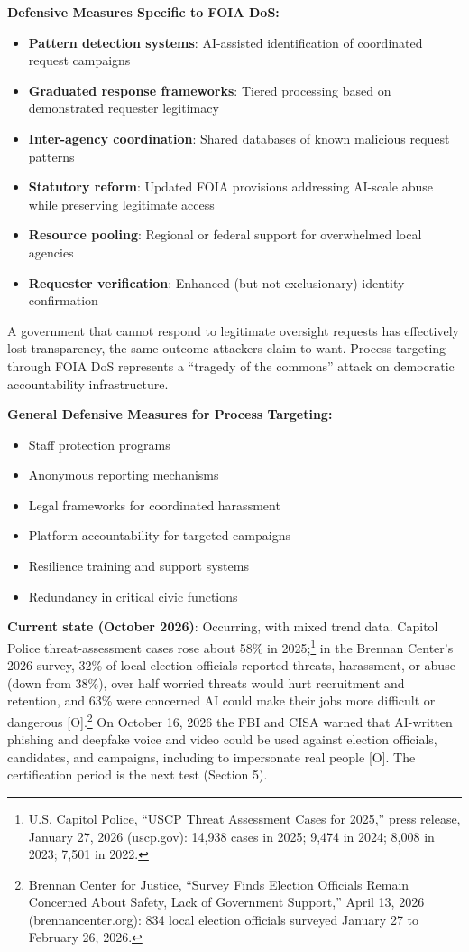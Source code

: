 \documentclass[11pt,letterpaper]{article}
\begin{document}
\textbf{Defensive Measures Specific to FOIA DoS:}
\begin{itemize}
  \item \textbf{Pattern detection systems}: AI-assisted identification of coordinated request campaigns
  \item \textbf{Graduated response frameworks}: Tiered processing based on demonstrated requester legitimacy
  \item \textbf{Inter-agency coordination}: Shared databases of known malicious request patterns
  \item \textbf{Statutory reform}: Updated FOIA provisions addressing AI-scale abuse while preserving legitimate access
  \item \textbf{Resource pooling}: Regional or federal support for overwhelmed local agencies
  \item \textbf{Requester verification}: Enhanced (but not exclusionary) identity confirmation
\end{itemize}

\begin{infobox}
A government that cannot respond to legitimate oversight requests has effectively lost transparency, the same outcome attackers claim to want. Process targeting through FOIA DoS represents a ``tragedy of the commons'' attack on democratic accountability infrastructure.
\end{infobox}

\textbf{General Defensive Measures for Process Targeting:}
\begin{itemize}
  \item Staff protection programs
  \item Anonymous reporting mechanisms
  \item Legal frameworks for coordinated harassment
  \item Platform accountability for targeted campaigns
  \item Resilience training and support systems
  \item Redundancy in critical civic functions
\end{itemize}

\textbf{Current state (October 2026)}: Occurring, with mixed trend data. Capitol Police threat-assessment cases rose about 58\% in 2025;\footnote{U.S. Capitol Police, ``USCP Threat Assessment Cases for 2025,'' press release, January 27, 2026 (uscp.gov): 14,938 cases in 2025; 9,474 in 2024; 8,008 in 2023; 7,501 in 2022.} in the Brennan Center's 2026 survey, 32\% of local election officials reported threats, harassment, or abuse (down from 38\%), over half worried threats would hurt recruitment and retention, and 63\% were concerned AI could make their jobs more difficult or dangerous [O].\footnote{Brennan Center for Justice, ``Survey Finds Election Officials Remain Concerned About Safety, Lack of Government Support,'' April 13, 2026 (brennancenter.org): 834 local election officials surveyed January 27 to February 26, 2026.} On October 16, 2026 the FBI and CISA warned that AI-written phishing and deepfake voice and video could be used against election officials, candidates, and campaigns, including to impersonate real people [O]. The certification period is the next test (Section 5).
\end{document}
